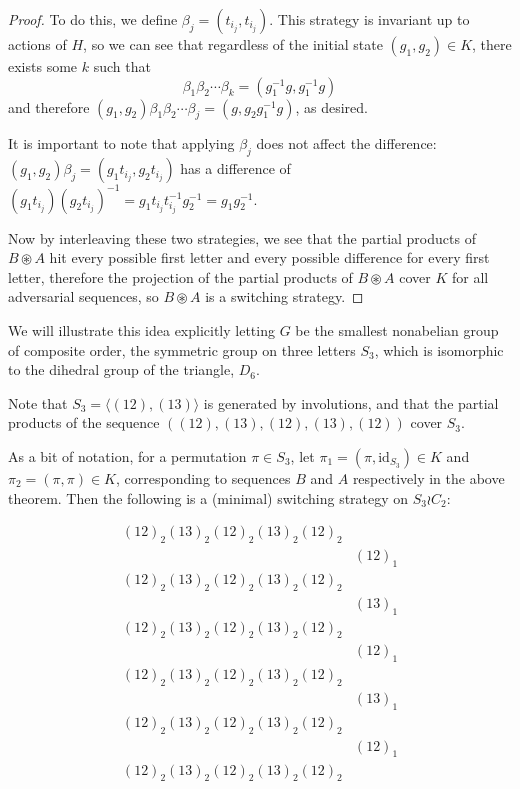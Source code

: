 \begin{proof}
  To do this, we define $\beta_j = (t_{i_j}, t_{i_j})$. This strategy is
  invariant up to actions of $H$, so we can see that regardless of the initial
  state $(g_1, g_2) \in K$, there exists some $k$ such that
  \begin{equation}
    \beta_1 \beta_2 \cdots \beta_k = (g_1^{-1}g, g_1^{-1}g)
  \end{equation} and therefore
   $(g_1, g_2) \beta_1 \beta_2 \cdots \beta_j = (g, g_2g_1^{-1}g)$, as desired.

   It is important to note that applying $\beta_j$ does not affect the
   difference: $(g_1, g_2) \beta_j = (g_1t_{i_j}, g_2t_{i_j})$ has a
   difference of
   $(g_1t_{i_j})(g_2t_{i_j})^{-1} = g_1t_{i_j}t_{i_j}^{-1}g_2^{-1} = g_1g_2^{-1}$.

  Now by interleaving these two strategies, we see that the partial products
  of $B \circledast A$ hit every possible first letter and every possible
  difference for every first letter,
  therefore the projection of the partial products of
  $B \circledast A$ cover $K$ for all adversarial sequences, so
  $B \circledast A$ is a switching strategy.
\end{proof}
We will illustrate this idea explicitly letting $G$ be the smallest nonabelian
group of composite order, the symmetric group on three letters $S_3$, which is
isomorphic to the dihedral group of the triangle, $D_6$.
\begin{example}
  Note that $S_3 = \langle(12), (13)\rangle$ is generated by involutions, and
  that the partial products of the sequence $((12),(13),(12),(13),(12))$
  cover $S_3$.

  As a bit of notation, for a permutation $\pi \in S_3$, let
  $\pi_1 = (\pi, \mathrm{id}_{S_3}) \in K$
  and
  $\pi_2 = (\pi, \pi) \in K$, corresponding to sequences $B$ and $A$
  respectively in the above theorem.
  Then the following is a (minimal) switching strategy on $S_3 \wr C_2$:
  \begin{singlespace}
  \begin{align*}
    (12)_2(13)_2(12)_2(13)_2(12)_2 \\
    &(12)_1 \\
    (12)_2(13)_2(12)_2(13)_2(12)_2 \\
    &(13)_1 \\
    (12)_2(13)_2(12)_2(13)_2(12)_2 \\
    &(12)_1 \\
    (12)_2(13)_2(12)_2(13)_2(12)_2 \\
    &(13)_1 \\
    (12)_2(13)_2(12)_2(13)_2(12)_2 \\
    &(12)_1 \\
    (12)_2(13)_2(12)_2(13)_2(12)_2
  \end{align*}
  \end{singlespace}
  \label{ex:TwoSymmetricGroups}
\end{example}
